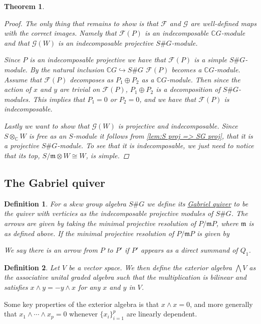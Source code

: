 \documentclass[11pt, a4paper, english]{article}
\numberwithin{prop}{section}
\numberwithin{lemma}{section}
\newtheorem{theorem}{Theorem}
\numberwithin{theorem}{section}
\newtheorem{defin}{Definition}
\numberwithin{defin}{section}
\numberwithin{example}{section}
\newcommand{\C}{\mathbb{C}}
\begin{document}
\begin{theorem}
\begin{proof}
The only thing that remains to show is that $\mathcal{F}$ and $\mathcal{G}$ are well-defined maps with the correct images. Namely that $\mathcal{F}(P)$ is an indecomposable $\C G$-module and that $\mathcal{G}(W)$ is an indecomposable projective $S\#G$-module.

Since $P$ is an indecomposable projective we have that $\mathcal{F}(P)$ is a simple $S\#G$-module. By the natural inclusion $\C G \hookrightarrow S\#G$ $\mathcal{F}(P)$ becomes a $\C G$-module. Assume that $\mathcal{F}(P)$ decomposes as $P_1 \oplus P_2$ as a $\C G$-module. Then since the action of $x$ and $y$ are trivial on $\mathcal{F}(P)$, $P_1 \oplus P_2$ is a decomposition of $S\#G$-modules. This implies that $P_1 = 0$ or $P_2=0$, and we have that $\mathcal{F}(P)$ is indecomposable.

Lastly we want to show that $\mathcal{G}(W)$ is projective and indecomposable. Since $S \otimes_\C W$ is free as an $S$-module it follows from \cref{lem:S proj => SG proj}, that it is a projective $S\#G$-module. To see that it is indecomposable, we just need to notice that its top, $S/\mathfrak{m} \otimes W \cong W$, is simple.
\end{proof}
\fi

\end{theorem}

\subsection{The Gabriel quiver}

\begin{defin}
For a skew group algebra $S\#G$ we define its \underline{Gabriel quiver} to be the quiver with verticies as the indecomposable projective modules of $S\#G$. The arrows are given by taking the minimal projective resolution of $P/\mathfrak{m}P$, where $\mathfrak{m}$ is as defined above. If the minimal projective resolution of $P/\mathfrak{m}P$ is given by
\begin{center}
\end{center}
We say there is an arrow from $P$ to $P'$ if $P'$ appears as a direct summand of $Q_1$.
\end{defin}

\begin{defin}
Let $V$ be a vector space. We then define the exterior algebra $\bigwedge V$ as the associative unital graded algebra such that the multiplication is bilinear and satisfies $x \wedge y = -y \wedge x$ for any $x$ and $y$ in $V$. 
\end{defin}
Some key properties of the exterior algebra is that $x \wedge x = 0$, and more generally that $x_1 \wedge \cdots \wedge x_p = 0$ whenever $\{x_i\}_{i=1}^p$ are linearly dependent.
\end{document}
